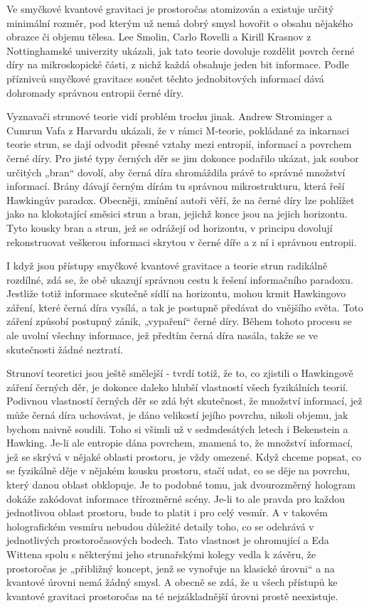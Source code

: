   Ve smyčkové kvantové gravitaci je prostoročas atomizován a existuje určitý minimální rozměr, pod
  kterým už nemá dobrý smysl hovořit o obsahu nějakého obrazce či objemu tělesa. Lee Smolin, Carlo
  Rovelli a Kirill Krasnov z Nottinghamské univerzity ukázali, jak tato teorie dovoluje rozdělit
  povrch černé díry na mikroskopické části, z nichž každá obsahuje jeden bit informace. Podle
  příznivců smyčkové gravitace součet těchto jednobitových informací dává dohromady správnou
  entropii černé díry. 
  
  Vyznavači strunové teorie vidí problém trochu jinak. Andrew Strominger a Cumrun Vafa z Harvardu
  ukázali, že v rámci M-teorie, pokládané za inkarnaci teorie strun, se dají odvodit přesné vztahy
  mezi entropií, informací a povrchem černé díry. Pro jisté typy černých děr se jim dokonce podařilo
  ukázat, jak soubor určitých „bran“ dovolí, aby černá díra shromáždila právě to správné množství
  informací. Brány dávají černým dírám tu správnou mikrostrukturu, která řeší Hawkingův paradox.
  Obecněji, zmínění autoři věří, že na černé díry lze pohlížet jako na klokotající směsici strun a
  bran, jejichž konce jsou na jejich horizontu. Tyto kousky bran a strun, jež se odrážejí od
  horizontu, v principu dovolují rekonstruovat veškerou informaci skrytou v černé díře a z ní i
  správnou entropii. 
  
  I když jsou přístupy smyčkové kvantové gravitace a teorie strun radikálně rozdílné, zdá se, že obě
  ukazují správnou cestu k řešení informačního paradoxu. Jestliže totiž informace skutečně sídlí na
  horizontu, mohou krmit Hawkingovo záření, které černá díra vysílá, a tak je postupně předávat do
  vnějšího světa. Toto záření způsobí postupný zánik, „vypaření“ černé díry. Během tohoto procesu se
  ale uvolní všechny informace, jež předtím černá díra nasála, takže se ve skutečnosti žádné
  neztratí. 
  
  Strunoví teoretici jsou ještě smělejší - tvrdí totiž, že to, co zjistili o Hawkingově záření
  černých děr, je dokonce daleko hlubší vlastností všech fyzikálních teorií. Podivnou vlastností
  černých děr se zdá být skutečnost, že množství informací, jež může černá díra uchovávat, je dáno
  velikostí jejího povrchu, nikoli objemu, jak bychom naivně soudili. Toho si všimli už v
  sedmdesátých letech i Bekenstein a Hawking. Je-li ale entropie dána povrchem, znamená to, že
  množství informací, jež se skrývá v nějaké oblasti prostoru, je vždy omezené. Když chceme popsat,
  co se fyzikálně děje v nějakém kousku prostoru, stačí udat, co se děje na povrchu, který danou
  oblast obklopuje. Je to podobné tomu, jak dvourozměrný hologram dokáže zakódovat informace
  třírozměrné scény. Je-li to ale pravda pro každou jednotlivou oblast prostoru, bude to platit i
  pro celý vesmír. A v takovém holografickém vesmíru nebudou důležité detaily toho, co se odehrává v
  jednotlivých prostoročasových bodech. Tato vlastnost je ohromující a Eda Wittena spolu s některými
  jeho strunařskými kolegy vedla k závěru, že prostoročas je „přibližný koncept, jenž se vynořuje na
  klasické úrovni“ a na kvantové úrovni nemá žádný smysl. A obecně se zdá, že u všech přístupů ke
  kvantové gravitaci prostoročas na té nejzákladnější úrovni prostě neexistuje. 
  
